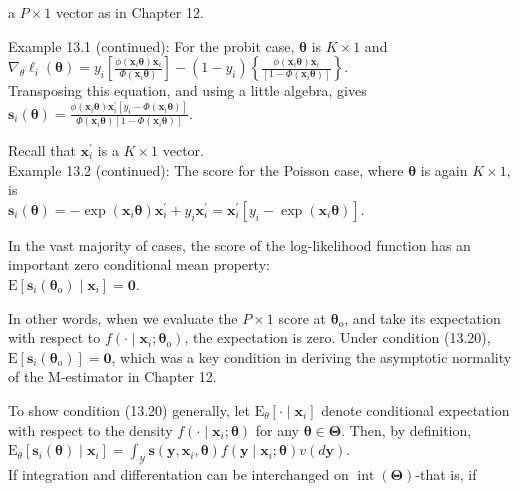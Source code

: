 \documentclass[10pt]{article}
\begin{document}
a $P \times 1$ vector as in Chapter 12.

Example 13.1 (continued): For the probit case, $\boldsymbol{\theta}$ is $K \times 1$ and\\
$\nabla_{\theta} \ell_{i}(\boldsymbol{\theta})=y_{i}\left[\frac{\phi\left(\mathbf{x}_{i} \boldsymbol{\theta}\right) \mathbf{x}_{i}}{\Phi\left(\mathbf{x}_{i} \boldsymbol{\theta}\right)}\right]-\left(1-y_{i}\right)\left\{\frac{\phi\left(\mathbf{x}_{i} \boldsymbol{\theta}\right) \mathbf{x}_{i}}{\left[1-\Phi\left(\mathbf{x}_{i} \boldsymbol{\theta}\right)\right]}\right\}$.\\
Transposing this equation, and using a little algebra, gives\\
$\mathbf{s}_{i}(\boldsymbol{\theta})=\frac{\phi\left(\mathbf{x}_{i} \boldsymbol{\theta}\right) \mathbf{x}_{i}^{\prime}\left[y_{i}-\Phi\left(\mathbf{x}_{i} \boldsymbol{\theta}\right)\right]}{\Phi\left(\mathbf{x}_{i} \boldsymbol{\theta}\right)\left[1-\Phi\left(\mathbf{x}_{i} \boldsymbol{\theta}\right)\right]}$.

Recall that $\mathbf{x}_{i}^{\prime}$ is a $K \times 1$ vector.\\
Example 13.2 (continued): The score for the Poisson case, where $\boldsymbol{\theta}$ is again $K \times 1$, is\\
$\mathbf{s}_{i}(\boldsymbol{\theta})=-\exp \left(\mathbf{x}_{i} \boldsymbol{\theta}\right) \mathbf{x}_{i}^{\prime}+y_{i} \mathbf{x}_{i}^{\prime}=\mathbf{x}_{i}^{\prime}\left[y_{i}-\exp \left(\mathbf{x}_{i} \boldsymbol{\theta}\right)\right]$.

In the vast majority of cases, the score of the log-likelihood function has an important zero conditional mean property:\\
$\mathrm{E}\left[\mathbf{s}_{i}\left(\boldsymbol{\theta}_{\mathrm{o}}\right) \mid \mathbf{x}_{i}\right]=\mathbf{0}$.

In other words, when we evaluate the $P \times 1$ score at $\boldsymbol{\theta}_{\mathrm{o}}$, and take its expectation with respect to $f\left(\cdot \mid \mathbf{x}_{i} ; \boldsymbol{\theta}_{\mathrm{o}}\right)$, the expectation is zero. Under condition (13.20), $\mathrm{E}\left[\mathbf{s}_{i}\left(\boldsymbol{\theta}_{\mathrm{o}}\right)\right]=\mathbf{0}$, which was a key condition in deriving the asymptotic normality of the M-estimator in Chapter 12.

To show condition (13.20) generally, let $\mathrm{E}_{\theta}\left[\cdot \mid \mathbf{x}_{i}\right]$ denote conditional expectation with respect to the density $f\left(\cdot \mid \mathbf{x}_{i} ; \boldsymbol{\theta}\right)$ for any $\boldsymbol{\theta} \in \boldsymbol{\Theta}$. Then, by definition,\\
$\mathrm{E}_{\theta}\left[\mathbf{s}_{i}(\boldsymbol{\theta}) \mid \mathbf{x}_{i}\right]=\int_{\mathscr{Y}} \mathbf{s}\left(\mathbf{y}, \mathbf{x}_{i}, \boldsymbol{\theta}\right) f\left(\mathbf{y} \mid \mathbf{x}_{i} ; \boldsymbol{\theta}\right) v(d \mathbf{y})$.\\
If integration and differentation can be interchanged on $\operatorname{int}(\boldsymbol{\Theta})$-that is, if
\end{document}
